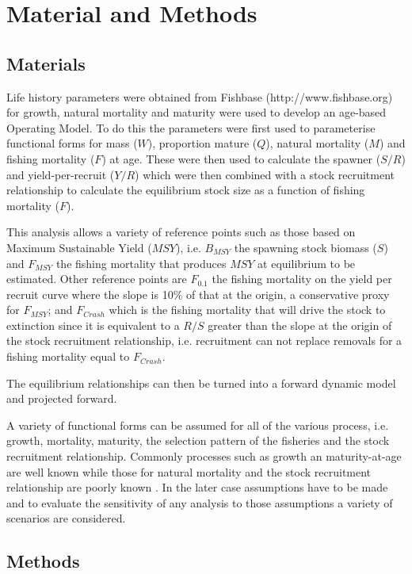 \documentclass[preprint,review,12pt]{elsarticle}
\begin{document}
\section{Material and Methods}
\subsection{Materials}


Life history parameters were obtained from Fishbase (http://www.fishbase.org) for growth, natural mortality and maturity were used to develop an age-based Operating Model. To do this the parameters were first used to parameterise functional forms for mass ($W$), proportion mature ($Q$), natural mortality ($M$) and fishing mortality ($F$) at age. These were then used to calculate the  spawner ($S/R$) and yield-per-recruit ($Y/R$) which were then combined with a stock recruitment relationship \cite{sissenwine1987alternative} to calculate the equilibrium stock size as a function of fishing mortality ($F$). 

This analysis allows a variety of reference points such as those based on Maximum Sustainable Yield ($MSY$), i.e. $B_{MSY}$ the spawning stock biomass ($S$) and $F_{MSY}$ the fishing mortality that produces $MSY$ at equilibrium to be estimated. Other reference points are $F_{0.1}$ the fishing mortality on the yield per recruit curve where the slope is 10\% of that at the origin, a conservative proxy for $F_{MSY}$; and $F_{Crash}$ which is the fishing mortality that will drive the stock to extinction since it is equivalent to a $R/S$ greater than the slope at the origin of the stock recruitment relationship, i.e. recruitment can not replace removals for a fishing mortality equal to $F_{Crash}$.  

The equilibrium relationships can then be turned into a forward dynamic model and projected forward.

A variety of functional forms can be assumed for all of the various process, i.e. growth, mortality, maturity, the selection pattern of the fisheries and the stock recruitment relationship. Commonly processes such as growth an maturity-at-age are well known while those for natural mortality and the stock recruitment relationship are poorly known \cite{michielsens2004bayesian}. In the later case assumptions have to be made and to evaluate the sensitivity of any analysis to those assumptions a variety of scenarios are considered. 

\subsection{Methods}
\end{document}
